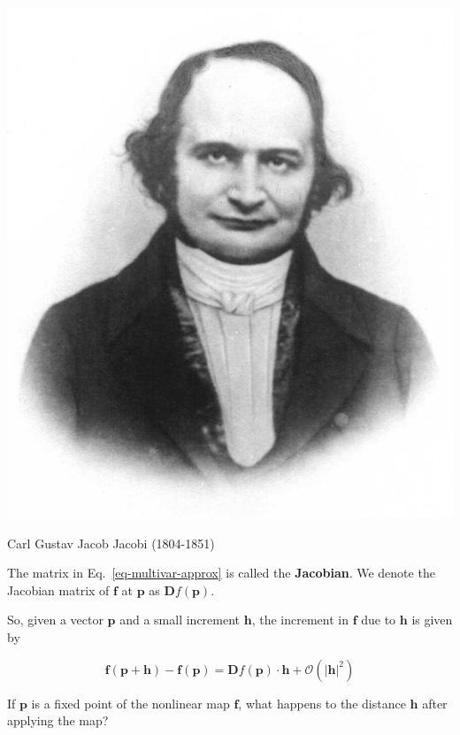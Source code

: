 \begin{marginfigure}[-5.7cm]
  \includegraphics{numeric/figures/c_jacobi}
  \caption{Carl Gustav Jacob Jacobi (1804-1851)}
\end{marginfigure}

The matrix in Eq.~\ref{eq-multivar-approx} is called the \textbf{Jacobian}. We denote the Jacobian matrix of ${\mathbf f}$ at ${\mathbf p}$ as ${\mathbf Df}({\mathbf p})$.

So, given a vector ${\mathbf p}$ and a small increment ${\mathbf h}$, the increment in ${\mathbf f}$ due to ${\mathbf h}$ is given by

\begin{equation}
{\mathbf f}({\mathbf p} + {\mathbf h}) - {\mathbf f}({\mathbf p}) = {\mathbf Df}({\mathbf p}) \cdot {\mathbf h} + \mathcal{O}\left(|{\mathbf h}|^2\right)
\end{equation} 

\begin{cue}
If $\mathbf p$ is a fixed point of the nonlinear map $\mathbf f$, what happens to the distance $\mathbf h$ after applying the map?
\end{cue}

